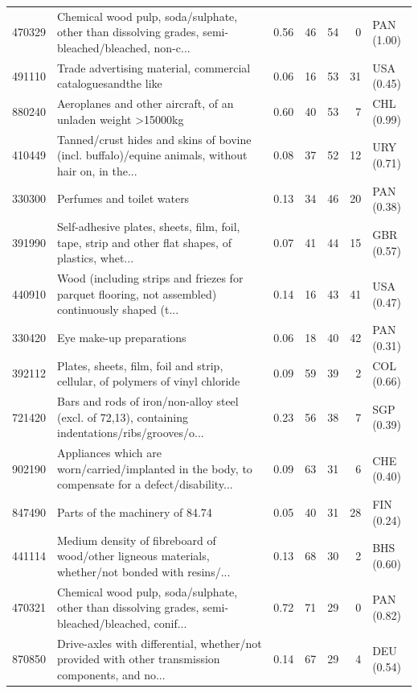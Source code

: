 \begin{tabular}{@{}l p{6.4cm} r r r r l@{}}
470329 & Chemical wood pulp, soda/\allowbreak{}sulphate, other than dissolving grades, semi-bleached/\allowbreak{}bleached, non-c... & 0.56 & 46 & 54 & 0 & PAN (1.00) \\
491110 & Trade advertising material, commercial cataloguesandthe like & 0.06 & 16 & 53 & 31 & USA (0.45) \\
880240 & Aeroplanes and other aircraft, of an unladen weight >15000kg & 0.60 & 40 & 53 & 7 & CHL (0.99) \\
410449 & Tanned/\allowbreak{}crust hides and skins of bovine (incl. buffalo)/\allowbreak{}equine animals, without hair on, in the... & 0.08 & 37 & 52 & 12 & URY (0.71) \\
330300 & Perfumes and toilet waters & 0.13 & 34 & 46 & 20 & PAN (0.38) \\
391990 & Self-adhesive plates, sheets, film, foil, tape, strip and other flat shapes, of plastics, whet... & 0.07 & 41 & 44 & 15 & GBR (0.57) \\
440910 & Wood (including strips and friezes for parquet flooring, not assembled) continuously shaped (t... & 0.14 & 16 & 43 & 41 & USA (0.47) \\
330420 & Eye make-up preparations & 0.06 & 18 & 40 & 42 & PAN (0.31) \\
392112 & Plates, sheets, film, foil and strip, cellular, of polymers of vinyl chloride & 0.09 & 59 & 39 & 2 & COL (0.66) \\
721420 & Bars and rods of iron/\allowbreak{}non-alloy steel (excl. of 72,13), containing indentations/\allowbreak{}ribs/\allowbreak{}grooves/\allowbreak{}o... & 0.23 & 56 & 38 & 7 & SGP (0.39) \\
902190 & Appliances which are worn/\allowbreak{}carried/\allowbreak{}implanted in the body, to compensate for a defect/\allowbreak{}disability... & 0.09 & 63 & 31 & 6 & CHE (0.40) \\
847490 & Parts of the machinery of 84.74 & 0.05 & 40 & 31 & 28 & FIN (0.24) \\
441114 & Medium density of fibreboard of wood/\allowbreak{}other ligneous materials, whether/\allowbreak{}not bonded with resins/\allowbreak{}... & 0.13 & 68 & 30 & 2 & BHS (0.60) \\
470321 & Chemical wood pulp, soda/\allowbreak{}sulphate, other than dissolving grades, semi-bleached/\allowbreak{}bleached, conif... & 0.72 & 71 & 29 & 0 & PAN (0.82) \\
870850 & Drive-axles with differential, whether/\allowbreak{}not provided with other transmission components, and no... & 0.14 & 67 & 29 & 4 & DEU (0.54) \\
\bottomrule
\end{tabular}
